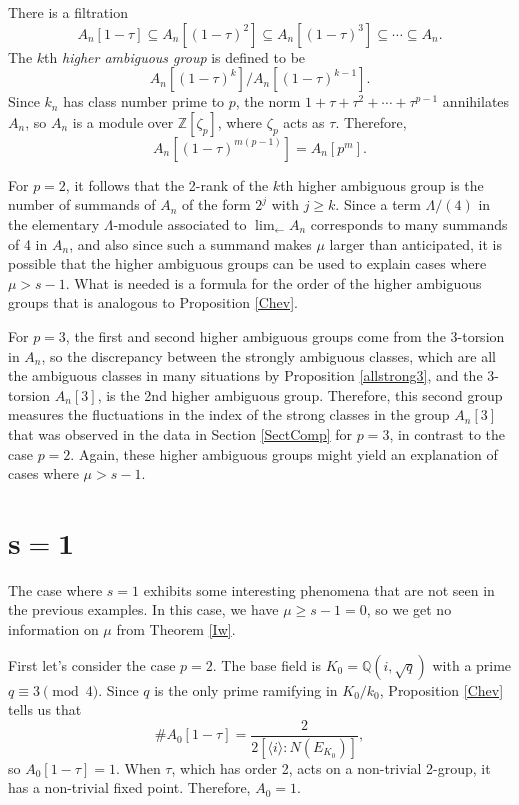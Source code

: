 \documentclass{amsart}
\begin{document}
There is a filtration
$$
 A_n[1-\tau] \subseteq A_n[(1-\tau)^2] \subseteq A_n[(1-\tau)^3] \subseteq \cdots \subseteq A_n.
$$
The $k$th {\it higher ambiguous group} is defined to be 
$$A_n[(1-\tau)^k]/A_n[(1-\tau)^{k-1}].$$ 
Since $k_n$ has class number prime to $p$, the norm $1+\tau+\tau^2+\cdots + \tau^{p-1}$ annihilates $A_n$,
so $A_n$ is a module over $\mathbb Z[\zeta_p]$, where $\zeta_p$ acts as $\tau$. Therefore, 
$$A_n[(1-\tau)^{m(p-1)}]=A_n[p^m].$$

For $p=2$, it follows that the 2-rank of the $k$th higher ambiguous group is the number of summands of $A_n$ of the form $2^j$ with $j\ge k$.
Since a term $\Lambda/(4)$ in the elementary $\Lambda$-module associated to $\lim_{\leftarrow} A_n$ corresponds to many summands of 4 in $A_n$, and also
since such a summand makes $\mu$ larger than anticipated, it is possible that the higher ambiguous groups can be used to explain cases where
$\mu > s-1$. What is needed is a formula for the order of the higher ambiguous groups that is analogous to Proposition \ref{Chev}.

For $p=3$, the first and second higher ambiguous groups come from the 3-torsion in $A_n$, so the discrepancy between
the strongly ambiguous classes, which are all the ambiguous classes in many situations by Proposition \ref{allstrong3}, and the 3-torsion $A_n[3]$,
is the 2nd higher ambiguous group. Therefore, this second group measures the fluctuations in the index of the strong
classes in the group $A_n[3]$ that was observed in the data in Section \ref{SectComp} for $p=3$, in contrast to the case $p=2$.
Again, these higher ambiguous groups might yield an explanation of cases where $\mu>s-1$.


\section{$\mathbf{s=1}$}

The case where $s=1$ exhibits some interesting phenomena that are not seen in the previous examples. In this case, we have $\mu\ge s-1=0$, 
so we get no information on $\mu$
from Theorem \ref{Iw}. 

First let's consider the case $p=2$. The base field is $K_0=\mathbb Q(i, \sqrt{q})$ with a prime $q\equiv 3\pmod 4$. Since $q$ is the only prime ramifying in $K_0/k_0$, Proposition \ref{Chev} tells us that
$$
\# A_0[1-\tau] = \frac{2}{2 [\langle i\rangle : N(E_{K_0})]},
$$
so $A_0[1-\tau]=1$. When $\tau$, which has order 2, acts on a non-trivial 2-group, it has a non-trivial fixed point. Therefore, $A_0=1$. 
\end{document}

